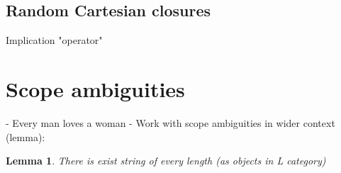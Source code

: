 \documentclass{article}
\newtheorem{lemma}[theorem]{Lemma}
\begin{document}
\subsection{Random Cartesian closures}
Implication "operator"

\section{Scope ambiguities}
- Every man loves a woman
\newline
- Work with scope ambiguities in wider context (lemma):
\newline
\begin{lemma}
There is exist string of every length (as objects in L category)
\end{lemma}



\end{document}
